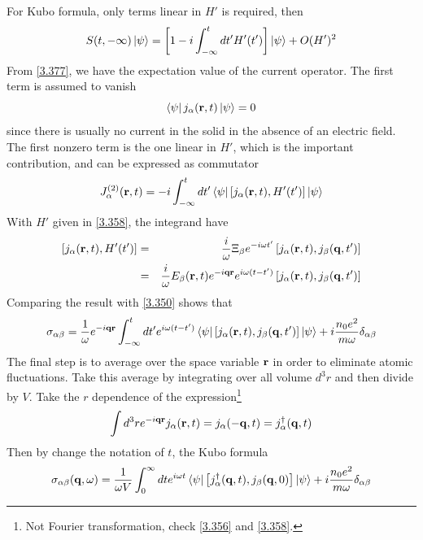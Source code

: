 For Kubo formula, only terms linear in $H'$ is required, then
\begin{equation}
    S(t,-\infty) \ket{\psi} = \left[ 1 - i \int_{-\infty}^t d t' H'(t') \right] \ket{\psi} + O(H')^2    \label{3.379}
\end{equation}
From \eqref{3.377}, we have the expectation value of the current operator.
The first term is assumed to vanish
\begin{equation}
    \bra{\psi} j_\alpha(\mathbf{r},t) \ket{\psi} = 0       \label{3.380}
\end{equation}
since there is usually no current in the solid in the absence of an electric field.
The first nonzero term is the one linear in $H'$, which is the important contribution, and can be expressed as commutator
\begin{equation}
    J_\alpha^{(2)} (\mathbf{r},t) = -i \int_{-\infty}^t dt' \bra{\psi} \left[ j_\alpha(\mathbf{r},t), H'(t') \right] \ket{\psi}       \label{3.381}
\end{equation}
With $H'$ given in \eqref{3.358}, the integrand have
\begin{eqnarray}
    \left[ j_\alpha(\mathbf{r},t), H'(t') \right] &=& \frac{i}{\omega} \Xi_\beta e^{-i \omega t'} \left[j_\alpha(\mathbf{r},t), j_\beta(\mathbf{q},t') \right] \label{3.382}\\
    &=& \frac{i}{\omega} E_\beta(\mathbf{r},t) e^{-i \mathbf{q} \mathbf{r}} e^{i\omega(t-t')} \left[ j_\alpha(\mathbf{r},t) , j_\beta(\mathbf{q},t')\right]   \nonumber
\end{eqnarray}
Comparing the result with \eqref{3.350} shows that
\begin{equation}
    \sigma_{\alpha\beta} = \frac{1}{\omega} e^{-i\mathbf{q}\mathbf{r}} \int_{-\infty}^t dt' e^{i\omega(t-t')} \bra{\psi} \left[ j_\alpha(\mathbf{r},t),j_\beta(\mathbf{q},t')\right] \ket{\psi} + i \frac{n_0 e^2}{m\omega} \delta_{\alpha\beta}    \label{3.383}
\end{equation}
The final step is to average over the space variable $\mathbf{r}$ in order to eliminate atomic fluctuations.
Take this average by integrating over all volume $d^3r$ and then divide by $V$.
Take the $r$ dependence of the expression\footnote{Not Fourier transformation, check \eqref{3.356} and \eqref{3.358}.}
\begin{equation}
    \int d^3 r e^{-i\mathbf{q} \mathbf{r}} j_\alpha(\mathbf{r},t) = j_\alpha(-\mathbf{q},t) = j_\alpha^\dagger(\mathbf{q},t)   \label{3.384}
\end{equation}
Then by change the notation of $t$, the Kubo formula
\begin{equation}
    \sigma_{\alpha\beta}(\mathbf{q},\omega) = \frac{1}{\omega V} \int_0^\infty dt e^{i\omega t} \bra{\psi} \left[j^\dagger_\alpha(\mathbf{q},t),j_\beta(\mathbf{q},0) \right] \ket{\psi} + i \frac{n_0 e^2}{m\omega} \delta_{\alpha \beta}   \label{3.385}
\end{equation}

